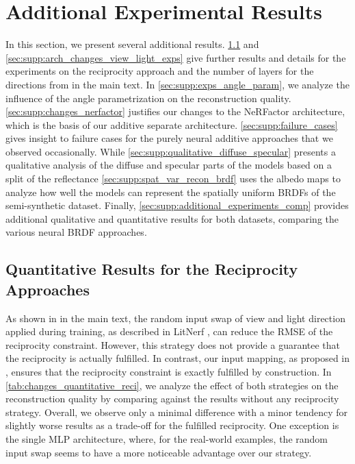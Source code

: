 \section{Additional Experimental Results}
\label{sec:supp:add_experimental_results}

In this section, we present several additional results. \cref{sec:supp:quantitative_reciprocity} and \cref{sec:supp:arch_changes_view_light_exps} give further results and details for the experiments on the reciprocity approach and the number of layers for the directions from 
\iftoggle{arxiv}{\cref{sec:analysis_brdf_models}}{Sec.~6.2}
in the main text. In \cref{sec:supp:exps_angle_param}, we analyze the influence of the angle parametrization on the reconstruction quality. \cref{sec:supp:changes_nerfactor} justifies our changes to the NeRFactor architecture, which is the basis of our additive separate architecture.
\cref{sec:supp:failure_cases} gives insight to failure cases for the purely neural additive approaches that we observed occasionally.
While \cref{sec:supp:qualitative_diffuse_specular} presents a qualitative analysis of the diffuse and specular parts of the models based on a split of the reflectance
\cref{sec:supp:spat_var_recon_brdf} uses the albedo maps to analyze how well the models can represent the spatially uniform BRDFs of the semi-synthetic dataset.
Finally, \cref{sec:supp:additional_experiments_comp} provides additional qualitative and quantitative results for both datasets, comparing the various neural BRDF approaches.


\subsection{Quantitative Results for the Reciprocity Approaches}
\label{sec:supp:quantitative_reciprocity}



As shown in 
\iftoggle{arxiv}{\cref{sec:analysis_brdf_models}}{Sec.~6.2}
in the main text, the random input swap of view and light direction applied during training, as described in LitNerf \cite{Sarkar23LitNerf}, can reduce the RMSE of the reciprocity constraint. However, this strategy does not provide a guarantee that the reciprocity is actually fulfilled. In contrast, our input mapping, as proposed in
\iftoggle{arxiv}{\cref{sec:reciMapping}}{Sec.~4.3},
ensures that the reciprocity constraint is exactly fulfilled by construction.
In \cref{tab:changes_quantitative_reci}, we analyze the effect of both strategies on the reconstruction quality by comparing against the results without any reciprocity strategy. Overall, we observe only a minimal difference with a minor tendency for slightly worse results as a trade-off for the fulfilled reciprocity.
One exception is the single MLP architecture, where, for the real-world examples, the random input swap seems to have a more noticeable advantage over our strategy.


